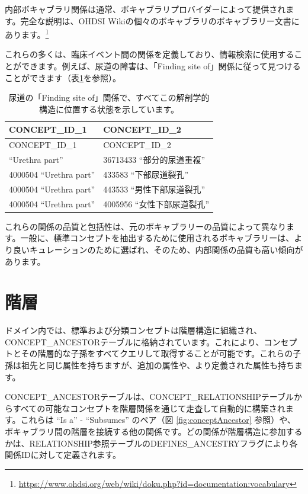 \documentclass[
  11pt]{book}
\theoremstyle{definition}
\theoremstyle{definition}
\theoremstyle{definition}
\theoremstyle{definition}
\theoremstyle{remark}
\begin{document}
内部ボキャブラリ関係は通常、ボキャブラリプロバイダーによって提供されます。完全な説明は、OHDSI Wikiの個々のボキャブラリのボキャブラリー文書にあります。\footnote{\url{https://www.ohdsi.org/web/wiki/doku.php?id=documentation:vocabulary}}

これらの多くは、臨床イベント間の関係を定義しており、情報検索に使用することができます。例えば、尿道の障害は、「Finding site of」関係に従って見つけることができます（表\ref{tab:findingSite}を参照）。

\begin{longtable}[]{@{}ll@{}}
\caption{\label{tab:findingSite} 尿道の「Finding site of」関係で、すべてこの解剖学的構造に位置する状態を示しています。}\tabularnewline
\toprule\noalign{}
CONCEPT\_ID\_1 & CONCEPT\_ID\_2 \\
\midrule\noalign{}
\endfirsthead
\toprule\noalign{}
CONCEPT\_ID\_1 & CONCEPT\_ID\_2 \\
\midrule\noalign{}
\endhead
\bottomrule\noalign{}
\endlastfoot
4000504 ``Urethra part'' & 36713433 ``部分的尿道重複'' \\
4000504 ``Urethra part'' & 433583 ``下部尿道裂孔'' \\
4000504 ``Urethra part'' & 443533 ``男性下部尿道裂孔'' \\
4000504 ``Urethra part'' & 4005956 ``女性下部尿道裂孔'' \\
\end{longtable}

これらの関係の品質と包括性は、元のボキャブラリーの品質によって異なります。一般に、標準コンセプトを抽出するために使用されるボキャブラリーは、より良いキュレーションのために選ばれ、そのため、内部関係の品質も高い傾向があります。

\section{階層}\label{conceptAncestor}

ドメイン内では、標準および分類コンセプトは階層構造に組織され、CONCEPT\_ANCESTORテーブルに格納されています。これにより、コンセプトとその階層的な子孫をすべてクエリして取得することが可能です。これらの子孫は祖先と同じ属性を持ちますが、追加の属性や、より定義された属性も持ちます。

CONCEPT\_ANCESTORテーブルは、CONCEPT\_RELATIONSHIPテーブルからすべての可能なコンセプトを階層関係を通じて走査して自動的に構築されます。これらは ``Is a'' - ``Subsumes'' のペア（図 \ref{fig:conceptAncestor} 参照）や、ボキャブラリ間の階層を接続する他の関係です。どの関係が階層構造に参加するかは、RELATIONSHIP参照テーブルのDEFINES\_ANCESTRYフラグにより各関係IDに対して定義されます。
\end{document}
